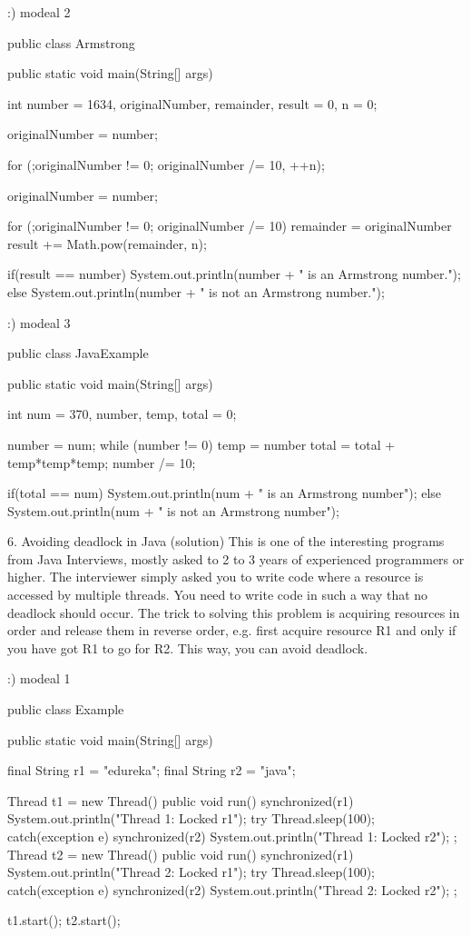 		:) modeal 2
		
		public class Armstrong {

    public static void main(String[] args) {

        int number = 1634, originalNumber, remainder, result = 0, n = 0;

        originalNumber = number;

        for (;originalNumber != 0; originalNumber /= 10, ++n);

        originalNumber = number;

        for (;originalNumber != 0; originalNumber /= 10)
        {
            remainder = originalNumber %
            result += Math.pow(remainder, n);
        }

        if(result == number)
            System.out.println(number + " is an Armstrong number.");
        else
            System.out.println(number + " is not an Armstrong number.");
    }
}

		:) modeal 3
		
		public class JavaExample {

    public static void main(String[] args) {

        int num = 370, number, temp, total = 0;

        number = num;
        while (number != 0)
        {
            temp = number %
            total = total + temp*temp*temp;
            number /= 10;
        }

        if(total == num)
            System.out.println(num + " is an Armstrong number");
        else
            System.out.println(num + " is not an Armstrong number");
    }
}


6. Avoiding deadlock in Java (solution)
This is one of the interesting programs from Java Interviews, mostly asked to 2 to 3 years of experienced 
programmers or higher. The interviewer simply asked you to write code where a resource is accessed by multiple threads.
You need to write code in such a way that no deadlock should occur. The trick to solving this problem is acquiring resources
in order and release them in reverse order,  e.g. first acquire resource R1 and only if you have got R1 to go for R2. This way,
you can avoid deadlock.



		:) modeal 1 
		
			
			public class Example{
 public static void main(String[] args){
   final String r1 = "edureka";
   final String r2 = "java";
 
   Thread t1 = new Thread() {
     public void run(){
       synchronized(r1){
        System.out.println("Thread 1: Locked r1");
        try{ Thread.sleep(100);} catch(exception e) {}
      synchronized(r2){
        System.out.println("Thread 1: Locked r2");
        }
     }
  }
};
 Thread t2 = new Thread() {
      public void run(){
       synchronized(r1){
        System.out.println("Thread 2: Locked r1");
        try{ Thread.sleep(100);} catch(exception e) {}
      synchronized(r2){
       System.out.println("Thread 2: Locked r2");
      }
    }
  }
};
 
t1.start();
t2.start();
}
}

